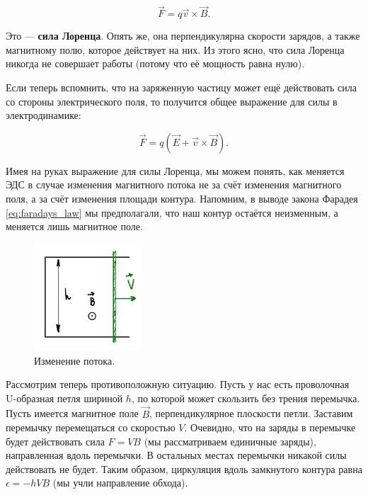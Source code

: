\documentclass[11pt,a4paper]{article}
\numberwithin{equation}{section}
\newcommand{\eps}{\epsilon}
\begin{document}
\begin{equation}
  \label{eq:lorentz_force}
  \vec{F} = q \vec{v} \times \vec{B}.
\end{equation}

Это --- \textbf{сила Лоренца}. Опять же, она перпендикулярна скорости
зарядов, а также магнитному полю, которое действует на них. Из этого
ясно, что сила Лоренца никогда не совершает работы (потому что её
мощность равна нулю). 

Если теперь вспомнить, что на заряженную частицу может ещё действовать
сила со стороны электрического поля, то получится общее выражение для
силы в электродинамике:

\begin{equation}
  \label{eq:force_electrodynamics}
  \vec{F} = q (\vec{E} + \vec{v} \times \vec{B}).
\end{equation}

Имея на руках выражение для силы Лоренца, мы можем понять, как
меняется ЭДС в случае изменения магнитного потока не за счёт изменения
магнитного поля, а за счёт изменения площади контура. Напомним, в
выводе закона Фарадея \eqref{eq:faradays_law} мы предполагали, что наш
контур остаётся неизменным, а меняется лишь магнитное поле. 

\begin{figure}
  \vspace{-1cm}
  \begin{center}
  \includegraphics[width=4cm]{faraday.pdf}  
  \end{center}
  \vspace{-1cm}
  \caption{Изменение потока.}
  \label{fig:faraday}
\end{figure}

Рассмотрим теперь противоположную ситуацию. Пусть у нас есть
проволочная U-образная петля шириной $h$, по которой может скользить без трения
перемычка. Пусть имеется магнитное поле $\vec{B}$, перпендикулярное
плоскости петли. Заставим перемычку перемещаться со скоростью
$V$. Очевидно, что на заряды в перемычке будет действовать сила $F =
V B$ (мы рассматриваем единичные заряды), направленная вдоль
перемычки. В остальных местах перемычки никакой силы действовать не
будет. Таким образом, циркуляция вдоль замкнутого контура равна
$\eps=-hVB$ (мы учли направление обхода). 
\end{document}

